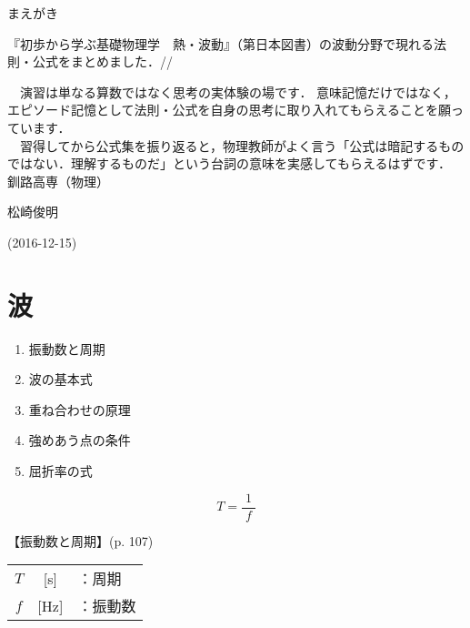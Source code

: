 \documentclass[10pt]{jarticle}
\begin{document}
\addtocounter{page}{-1}
\thispagestyle{empty}

まえがき\\

{\scriptsize
『初歩から学ぶ基礎物理学　熱・波動』（第日本図書）の波動分野で現れる法則・公式をまとめました．//

　演習は単なる算数ではなく思考の実体験の場です．
意味記憶だけではなく，エピソード記憶として法則・公式を自身の思考に取り入れてもらえることを願っています．\\

　習得してから公式集を振り返ると，物理教師がよく言う「公式は暗記するものではない．理解するものだ」という台詞の意味を実感してもらえるはずです．\\




\hfill
釧路高専（物理）

\hfill
松崎俊明

\vfill
\hfill
(2016-12-15)
}


\addtocounter{page}{-1}
\thispagestyle{empty}
\tableofcontents



\newpage
\addtocounter{page}{-1}
\thispagestyle{empty}
\section{波}

\begin{enumerate}
\small
\itemsep-4mm
\item 振動数と周期\\
\item 波の基本式\\
\item 重ね合わせの原理\\
\item 強めあう点の条件\\
\item 屈折率の式\\
\end{enumerate}




\newpage
\[
T = \frac{1}{\; f \;}
\]


\vskip3mm
【振動数と周期】{\footnotesize (p. 107)}

\begin{tabular}{ccl}
$T$	&[s]	&：周期 \\
$f$	& [Hz]	&：振動数
\end{tabular}
\end{document}
